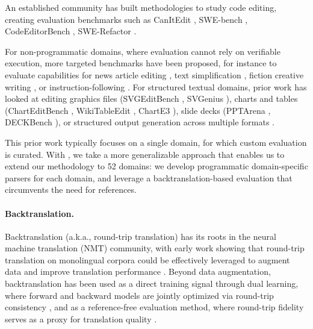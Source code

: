 \documentclass{article} %
\begin{document}
An established community has built methodologies to study code editing, creating evaluation benchmarks such as CanItEdit \citep{Cassano2023CanIE}, SWE-bench \citep{Jimenez2023SWEbenchCL}, CodeEditorBench \citep{Guo2024CodeEditorBenchEC}, SWE-Refactor \citep{Xu2026SWERefactorAR}.

For non-programmatic domains, where evaluation cannot rely on verifiable execution, more targeted benchmarks have been proposed, for instance to evaluate capabilities for news article editing \citep{Spangher2022NewsEditsAN}, text simplification \citep{Laban2023SWiPEAD}, fiction creative writing \citep{Chakrabarty2024CanAW}, or instruction-following \citep{Raheja2023CoEdITTE,Dwivedi-Yu2022EditEvalAI}. For structured textual domains, prior work has looked at editing graphics files (SVGEditBench \citep{Nishina2024SVGEditBenchAB}, SVGenius \citep{Chen2025SVGeniusBL}), charts and tables (ChartEditBench \citep{Kapadnis2026ChartEditBenchEG}, WikiTableEdit \citep{Li2024WikiTableEditAB}, ChartE3 \citep{Li2026ChartE3AC}), slide decks (PPTArena \citep{Ofengenden2025PPTArenaAB}, DECKBench \citep{Jang2026DECKBenchBM}), or structured output generation across multiple formats \citep{Yang2025StructEvalBL}.

This prior work typically focuses on a single domain, for which custom evaluation is curated. With \benchmark{}, we take a more generalizable approach that enables us to extend our methodology to 52 domains: we develop programmatic domain-specific parsers for each domain, and leverage a backtranslation-based evaluation that circumvents the need for references.

\paragraph{Backtranslation.}

Backtranslation (a.k.a., round-trip translation) has its roots in the neural machine translation (NMT) community, with early work showing that round-trip translation on monolingual corpora could be effectively leveraged to augment data and improve translation performance \citep{Sennrich2015ImprovingNM,Lample2017UnsupervisedMT}. Beyond data augmentation, backtranslation has been used as a direct training signal through dual learning, where forward and backward models are jointly optimized via round-trip consistency \citep{He2016DualLF,Hoang2018IterativeBF}, and as a reference-free evaluation method, where round-trip fidelity serves as a proxy for translation quality \citep{Somers2005RoundtripTW,Zhuo2022RethinkingRT}.
\end{document}
